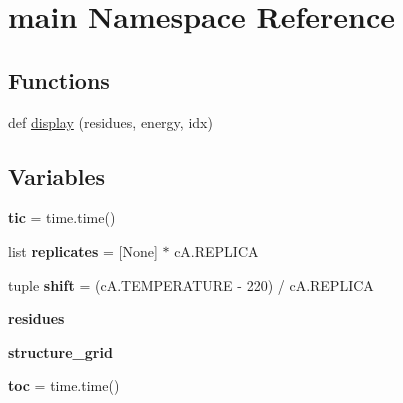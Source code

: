 \hypertarget{namespacemain}{}\section{main Namespace Reference}
\label{namespacemain}
\subsection*{Functions}
\begin{DoxyCompactItemize}
\item 
def \hyperlink{namespacemain_aa6f8a1443820135b3cf84d9bafcc0028}{display} (residues, energy, idx)
\end{DoxyCompactItemize}
\subsection*{Variables}
\begin{DoxyCompactItemize}
\item 
\mbox{\label{namespacemain_a3c60151b99b469323d8c15116db80817}} 
{\bfseries tic} = time.\+time()
\item 
\mbox{\label{namespacemain_ab56df29b0534dd6fbd128d54225bee86}} 
list {\bfseries replicates} = \mbox{[}None\mbox{]} $\ast$ c\+A.\+R\+E\+P\+L\+I\+CA
\item 
\mbox{\label{namespacemain_a9c81977c283643c4d0c96b128722e771}} 
tuple {\bfseries shift} = (c\+A.\+T\+E\+M\+P\+E\+R\+A\+T\+U\+RE -\/ 220) / c\+A.\+R\+E\+P\+L\+I\+CA
\item 
\mbox{\label{namespacemain_aa03ea582ff8e07a50e1d850a94da8247}} 
{\bfseries residues}
\item 
\mbox{\label{namespacemain_a67a4a2ee96191c0257e4744c29dacebf}} 
{\bfseries structure\+\_\+grid}
\item 
\mbox{\label{namespacemain_a42e4c3ac704d1a088d18d3e7c32cca23}} 
{\bfseries toc} = time.\+time()
\end{DoxyCompactItemize}


